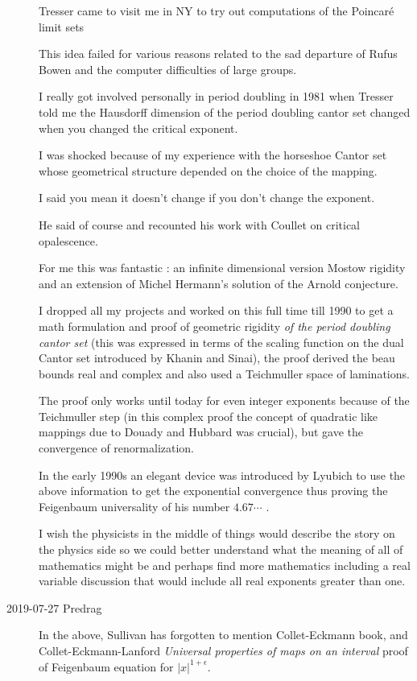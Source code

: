 \begin{description}
Tresser came to visit me in NY to try out computations of the Poincar\'e
limit sets

This idea failed for various reasons related to the sad departure of
Rufus Bowen and the computer difficulties of large groups.

I really got involved personally in period doubling in 1981 when Tresser
told me the Hausdorff dimension  of the period doubling cantor set changed
when you changed the critical exponent.

I was shocked because of my experience with the horseshoe Cantor set
whose geometrical structure depended on the choice of the mapping.

I said you mean it doesn't change if you don't change the exponent.

He said of course and recounted his work with Coullet on critical
opalescence.

For me this was fantastic :
an infinite dimensional version Mostow rigidity and an extension of
Michel Hermann's solution of the Arnold conjecture.

I dropped all my projects and worked on this full time till 1990 to get a
math formulation and proof of geometric  rigidity \emph{of the period
doubling cantor set} (this was expressed in terms of the scaling function
on the dual Cantor set introduced by Khanin and Sinai), the
proof derived the beau bounds real and complex and also used a
Teichmuller space of laminations.

The proof only works until today for even integer exponents because of
the Teichmuller step (in this complex proof the concept of quadratic like
mappings due to Douady and Hubbard was crucial), but gave the convergence
of renormalization.

In the early 1990s an elegant device was introduced by Lyubich to use the
above information to get the exponential convergence thus proving the
Feigenbaum universality of his number $4.67\cdots$ .

I wish the physicists in the middle of things would describe the story on
the physics side so we could better understand what the meaning of all of
mathematics might be and perhaps find more mathematics including a real
variable discussion that would include all real exponents greater than
one.

\item[2019-07-27 Predrag]
In the above, Sullivan has forgotten to mention Collet-Eckmann
book, and Collet-Eckmann-Lanford {\em
Universal properties of maps on an interval} proof of Feigenbaum
equation for $|x|^{1+\epsilon}$.


\end{description}
